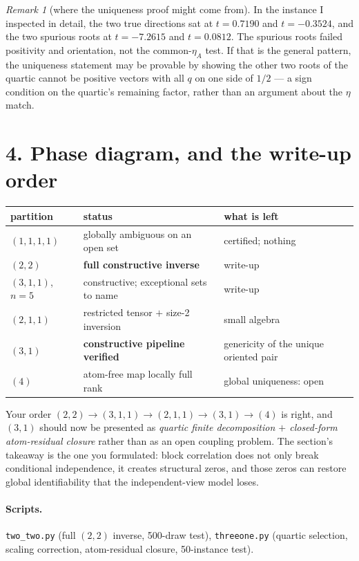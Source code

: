 \documentclass[11pt]{article}
\theoremstyle{remark}
\newtheorem*{remark}{Remark}
\begin{document}
\begin{remark}[where the uniqueness proof might come from]
In the instance I inspected in detail, the two true directions sat at $t=0.7190$ and $t=-0.3524$, and the two spurious roots at $t=-7.2615$ and $t=0.0812$. The spurious roots failed positivity and orientation, not the common-$\eta_A$ test. If that is the general pattern, the uniqueness statement may be provable by showing the other two roots of the quartic cannot be positive vectors with all $q$ on one side of $1/2$ --- a sign condition on the quartic's remaining factor, rather than an argument about the $\eta$ match.
\end{remark}

\section*{4. Phase diagram, and the write-up order}

\begin{center}\small
\begin{tabular}{@{}lll@{}}
\toprule
partition & status & what is left\\
\midrule
$(1,1,1,1)$ & globally ambiguous on an open set & certified; nothing\\
$(2,2)$ & \textbf{full constructive inverse} & write-up\\
$(3,1,1)$, $n=5$ & constructive; exceptional sets to name & write-up\\
$(2,1,1)$ & restricted tensor $+$ size-2 inversion & small algebra\\
$(3,1)$ & \textbf{constructive pipeline verified} & genericity of the unique oriented pair\\
$(4)$ & atom-free map locally full rank & global uniqueness: open\\
\bottomrule
\end{tabular}
\end{center}

Your order $(2,2)\to(3,1,1)\to(2,1,1)\to(3,1)\to(4)$ is right, and $(3,1)$ should now be presented as \emph{quartic finite decomposition $+$ closed-form atom-residual closure} rather than as an open coupling problem. The section's takeaway is the one you formulated: block correlation does not only break conditional independence, it creates structural zeros, and those zeros can restore global identifiability that the independent-view model loses.

\paragraph{Scripts.} \texttt{two\_two.py} (full $(2,2)$ inverse, 500-draw test), \texttt{threeone.py} (quartic selection, scaling correction, atom-residual closure, 50-instance test).
\end{document}

